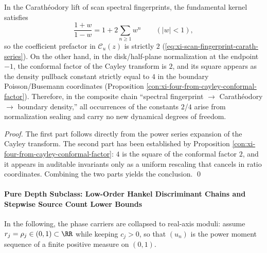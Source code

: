 \begin{proposition}\label{prop:xi-scan-coefficient-four-double-cayley}
In the Carath\'eodory lift of scan spectral fingerprints, the fundamental kernel satisfies
\[
\frac{1+w}{1-w}=1+2\sum_{n\ge 1}w^n\qquad(|w|<1),
\]
so the coefficient prefactor in \(\mathscr{C}_u(z)\) is strictly \(2\) (\eqref{eq:xi-scan-fingerprint-carath-series}).
On the other hand, in the disk/half-plane normalization at the endpoint \(-1\), the conformal factor of the Cayley transform is \(2\), and its square appears as the density pullback constant strictly equal to \(4\) in the boundary Poisson/Busemann coordinates (Proposition \ref{con:xi-four-from-cayley-conformal-factor}).
Therefore, in the composite chain ``spectral fingerprint \(\to\) Carath\'eodory \(\to\) boundary density,'' all occurrences of the constants \(2\)/\(4\) arise from normalization sealing and carry no new dynamical degrees of freedom.
\end{proposition}
\begin{proof}
The first part follows directly from the power series expansion of the Cayley transform.
The second part has been established by Proposition \ref{con:xi-four-from-cayley-conformal-factor}: \(4\) is the square of the conformal factor \(2\), and it appears in auditable invariants only as a uniform rescaling that cancels in ratio coordinates.
Combining the two parts yields the conclusion. \qed
\end{proof}

\paragraph{Pure Depth Subclass: Low-Order Hankel Discriminant Chains and Stepwise Source Count Lower Bounds}
In the following, the phase carriers are collapsed to real-axis moduli: assume \(r_j=\rho_j\in(0,1)\subset\RR\) while keeping \(c_j>0\), so that \((u_n)\) is the power moment sequence of a finite positive measure on \((0,1)\).


